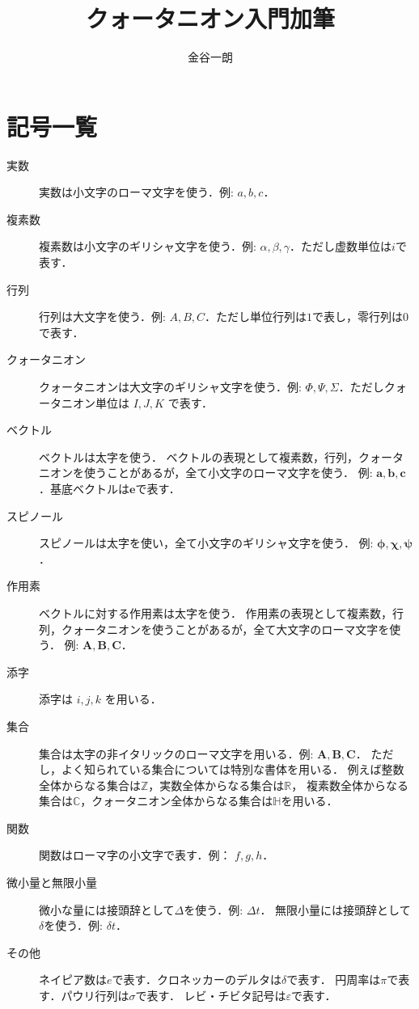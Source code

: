 \documentclass{jsbook}
\title{クォータニオン入門加筆}
\author{金谷一朗}
\newcommand{\bvec}[1]{\boldsymbol{#1}}
\newcommand{\bop}[1]{\boldsymbol{#1}}
\newcommand{\bg}[1]{\mathbf{#1}}
\newcommand{\ii}{I}%
\newcommand{\jj}{J}%
\newcommand{\kk}{K}%
\newcommand{\Zero}{0}%
\newcommand{\One}{1}%
\newcommand{\im}{i}%
\newcommand{\ve}{\bvec{e}}
\newcommand{\verysmall}{\varDelta}
\newcommand{\inftysmall}{\delta}
\begin{document}
\setlength{\baselineskip}{17pt}

\maketitle
\tableofcontents

\chapter*{記号一覧}

\begin{description}
\item[実数] 実数は小文字のローマ文字を使う．例: $a,b,c$．
\item[複素数] 複素数は小文字のギリシャ文字を使う．例: $\alpha,\beta,\gamma$．ただし虚数単位は$\im$で表す．
\item[行列] 行列は大文字を使う．例: $A,B,C$．ただし単位行列は$\One$で表し，零行列は$\Zero$で表す．
\item[クォータニオン] クォータニオンは大文字のギリシャ文字を使う．例: $\varPhi,\varPsi,\varSigma$．ただしクォータニオン単位は $\ii,\jj,\kk$ で表す．
\item[ベクトル] ベクトルは太字を使う．
ベクトルの表現として複素数，行列，クォータニオンを使うことがあるが，全て小文字のローマ文字を使う．
例: $\bvec{a},\bvec{b},\bvec{c}$．基底ベクトルは$\ve$で表す．
\item[スピノール] スピノールは太字を使い，全て小文字のギリシャ文字を使う．
例: $\bvec{\phi},\bvec{\chi},\bvec{\psi}$．
\item[作用素] ベクトルに対する作用素は太字を使う．
作用素の表現として複素数，行列，クォータニオンを使うことがあるが，全て大文字のローマ文字を使う．
例: $\bop{A},\bop{B},\bop{C}$．
\item[添字] 添字は $i,j,k$ を用いる．
\item[集合] 集合は太字の非イタリックのローマ文字を用いる．例: $\bg{A},\bg{B},\bg{C}$．
ただし，よく知られている集合については特別な書体を用いる．
例えば整数全体からなる集合は$\mathbb{Z}$，実数全体からなる集合は$\mathbb{R}$，
複素数全体からなる集合は$\mathbb{C}$，クォータニオン全体からなる集合は$\mathbb{H}$を用いる．
\item[関数] 関数はローマ字の小文字で表す．例： $f,g,h$．
\item[微小量と無限小量] 微小な量には接頭辞として$\verysmall$を使う．例: $\verysmall t$．
無限小量には接頭辞として$\inftysmall$を使う．例: $\inftysmall t$．
\item[その他] ネイピア数は$e$で表す．クロネッカーのデルタは$\delta$で表す．
円周率は$\pi$で表す．パウリ行列は$\sigma$で表す．
レビ・チビタ記号は$\varepsilon$で表す．
\end{description}
\end{document}
